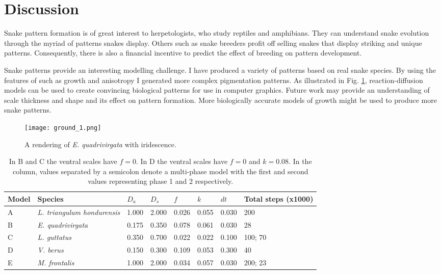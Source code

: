 \newpage

\section{Discussion}
Snake pattern formation is of great interest to herpetologists, who study reptiles and amphibians. They can understand snake evolution through the myriad of patterns snakes display. Others such as snake breeders profit off selling snakes that display striking and unique patterns. Consequently, there is also a financial incentive to predict the effect of breeding on pattern development. 

Snake patterns provide an interesting modelling challenge. I have produced a variety of patterns based on real snake species. By using the features of \ProgramName{} such as growth and anisotropy I generated more complex pigmentation patterns. As illustrated in Fig. \ref{fig:SnakeRendering}, reaction-diffusion models can be used to create convincing biological patterns for use in computer graphics. Future work may provide an understanding of scale thickness and shape and its effect on pattern formation. More biologically accurate models of growth might be used to produce more snake patterns.

\begin{figure}[ht]
	\centering
	\texttt{[image: ground\_1.png]}
	\caption{A rendering of \textit{E. quadrivirgata} with iridescence.}
	\label{fig:SnakeRendering}
\end{figure}

\begin{table}[h]
	\centering
	\begin{tabular}{|l|l|l|l|l|l|l|l|}
	\hline
	Model & Species                      &$D_a$ &$D_s$ &$f$    &$k$   &$dt$ &Total steps (x1000)\\ \hline 
	A     &\textit{L. triangulum hondurensis} &1.000 &2.000 &0.026 &0.055 &0.030 &200                \\ \hline
	B     &\textit{E. quadrivirgata}     &0.175 &0.350 &0.078 &0.061 &0.030 &28                 \\ \hline
	C     &\textit{L. guttatus}          &0.350 &0.700 &0.022 &0.022 &0.100 &100; 70            \\ \hline
	D     &\textit{V. berus}             &0.150 &0.300 &0.109 &0.053 &0.300 &40                 \\ \hline
	E     &\textit{M. frontalis}         &1.000 &2.000 &0.034 &0.057 &0.030 &200; 23            \\ \hline
	\end{tabular}
	\caption {In B and C the ventral scales have $f=0$. In D the ventral scales have $f=0$ and $k=0.08$. In the  column, values separated by a semicolon denote a multi-phase model with the first and second values representing phase 1 and 2 respectively.}
	\label{tab:gsSnakeParameters}
\end{table}

